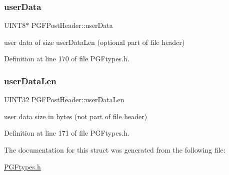 \subsubsection{\texorpdfstring{userData}{userData}}
{\footnotesize\ttfamily U\+I\+N\+T8$\ast$ P\+G\+F\+Post\+Header\+::user\+Data}



user data of size user\+Data\+Len (optional part of file header) 



Definition at line 170 of file P\+G\+Ftypes.\+h.

\mbox{\label{structPGFPostHeader_a0fb630d6cd14ed865dd5fe20227279f2}} 
\subsubsection{\texorpdfstring{userDataLen}{userDataLen}}
{\footnotesize\ttfamily U\+I\+N\+T32 P\+G\+F\+Post\+Header\+::user\+Data\+Len}



user data size in bytes (not part of file header) 



Definition at line 171 of file P\+G\+Ftypes.\+h.



The documentation for this struct was generated from the following file\+:\begin{DoxyCompactItemize}
\item 
\mbox{\hyperlink{PGFtypes_8h}{P\+G\+Ftypes.\+h}}\end{DoxyCompactItemize}

